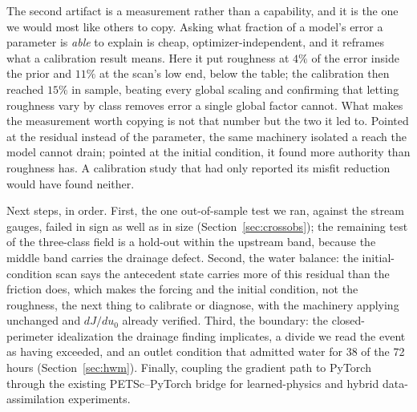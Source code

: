 \documentclass[11pt]{article}
\begin{document}
The second artifact is a measurement rather than a capability, and it
is the one we would most like others to copy. Asking what fraction of
a model's error a parameter is \emph{able} to explain is cheap,
optimizer-independent, and it reframes what a calibration result
means. Here it put roughness at $4\%$ of the error inside the
prior and $11\%$ at the scan's low end, below the table; the
calibration then reached $15\%$ in sample, beating every global
scaling and confirming that letting roughness vary by class removes
error a single global factor cannot. What makes the measurement worth
copying is not that number but the two it led to. Pointed at the
residual instead of the parameter, the same machinery isolated a
reach the model cannot drain; pointed at the initial condition, it
found more authority than roughness has. A calibration study that
had only reported its misfit reduction would have found neither.

Next steps, in order. First, the one out-of-sample test we ran,
against the stream gauges, failed in sign as well as in size
(Section~\ref{sec:crossobs}); the remaining test of the three-class
field is a hold-out within the upstream band, because the middle band
carries the drainage defect. Second, the water balance: the
initial-condition scan says the antecedent state carries more of this
residual than the friction does, which makes the forcing and the
initial condition, not the roughness, the next thing to calibrate or
diagnose, with the machinery applying unchanged and $dJ/du_0$ already
verified. Third, the boundary: the closed-perimeter idealization the
drainage finding implicates, a divide we read the event as having
exceeded, and an outlet condition that admitted water for 38 of the 72
hours (Section~\ref{sec:hwm}). Finally, coupling the
gradient path to PyTorch through the existing
PETSc--PyTorch bridge for learned-physics and hybrid data-assimilation
experiments.
\end{document}

